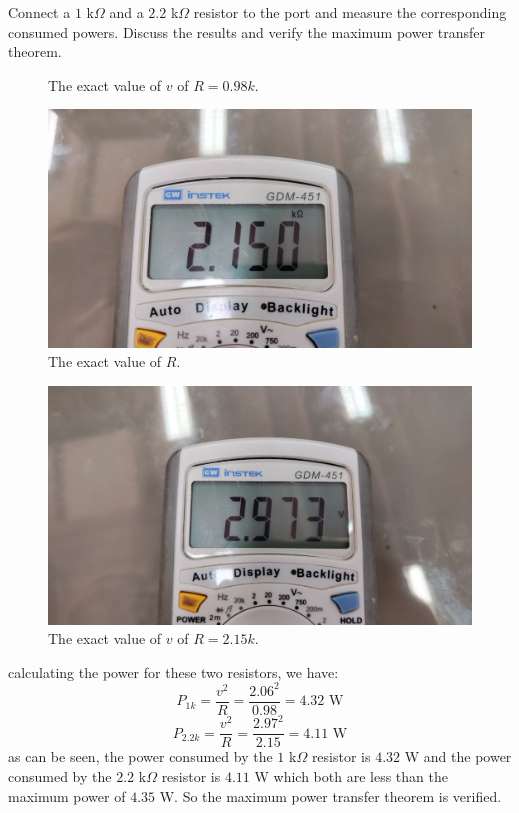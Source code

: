 \documentclass[11pt]{article}
\begin{document}
\begin{question}
\begin{subquestion}{Connect a $1$ k$\Omega$ and a $2.2$ k$\Omega$ resistor to the port and measure the corresponding consumed powers. Discuss the results and verify the maximum power transfer theorem.}
{\begin{figure}[H]
                \caption{The exact value of $v$ of $R=0.98k$.}
            \end{figure}
            \begin{figure}[H]
                \centering
                \includegraphics[scale=\PicScale,angle=0]{Fig/25.jpeg}
                \caption{The exact value of $R$.}
            \end{figure}
            \begin{figure}[H]
                \centering
                \includegraphics[scale=\PicScale,angle=0]{Fig/26.jpeg}
                \caption{The exact value of $v$ of $R = 2.15k$.}
            \end{figure}

            calculating the power for these two resistors, we have:
            \begin{equation*}
                P_{1k} = \frac{v^2}{R} = \frac{2.06^2}{0.98} = 4.32 \text{ W}
            \end{equation*}
            \begin{equation*}
                P_{2.2k} = \frac{v^2}{R} = \frac{2.97^2}{2.15} = 4.11 \text{ W}
            \end{equation*}
            as can be seen, the power consumed by the $1$ k$\Omega$ resistor is $4.32$ W and
            the power consumed by the $2.2$ k$\Omega$ resistor is $4.11$ W which both are less
            than the maximum power of $4.35$ W.
            So the maximum power transfer theorem is verified.
        }
    \end{subquestion}



\end{question}
\end{document}

